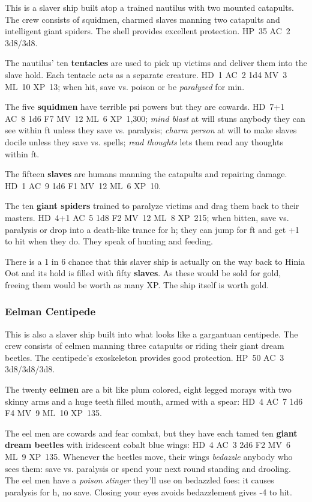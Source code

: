 \documentclass[11pt]{bxart}
\begin{document}
This is a slaver ship built atop a trained nautilus with two mounted
catapults. The crew consists of squidmen, charmed slaves manning two
catapults and intelligent giant spiders. The shell provides excellent
protection. HP~35 AC~2 3d8/3d8.

The nautilus' ten \textbf{tentacles} are used to pick up victims and
deliver them into the slave hold. Each tentacle acts as a separate
creature. HD~1 AC~2 1d4 MV~3 ML~10 XP~13; when hit, save vs. poison or
be \textit{paralyzed} for \unit[10]{min}.

The five \textbf{squidmen} have terrible psi powers but they are
cowards. HD~7+1 AC~8 1d6 F7 MV~12 ML~6 XP~1,300; \textit{mind blast} at
will stuns anybody they can see within \unit[60]{ft} unless they save
vs. paralysis; \textit{charm person} at will to make slaves docile
unless they save vs. spells; \textit{read thoughts} lets them read any
thoughts within \unit[60]{ft}.

The fifteen \textbf{slaves} are humans manning the catapults and
repairing damage. HD~1 AC~9 1d6 F1 MV~12 ML~6 XP~10.

The ten \textbf{giant spiders} trained to paralyze victims and drag
them back to their masters. HD~4+1 AC~5 1d8 F2 MV~12 ML~8 XP~215; when
bitten, save vs. paralysis or drop into a death-like trance for \unit[6]{h};
they can jump for \unit[20]{ft} and get +1 to hit when they do. They speak of
hunting and feeding.

There is a 1 in 6 chance that this slaver ship is actually on the way
back to Hinia Oot and its hold is filled with fifty \textbf{slaves}.
As these would be sold for \unit[25,000]{gold}, freeing them would be worth as
many XP. The ship itself is worth \unit[35,000]{gold}.

\subsubsection{Eelman Centipede}

This is also a slaver ship built into what looks like a gargantuan
centipede. The crew consists of eelmen manning three catapults or
riding their giant dream beetles. The centipede's exoskeleton provides
good protection. HP~50 AC~3 3d8/3d8/3d8.

The twenty \textbf{eelmen} are a bit like plum colored, eight legged
morays with two skinny arms and a huge teeth filled mouth, armed with
a spear: HD~4 AC~7 1d6 F4 MV~9 ML~10 XP~135.

The eel men are cowards and fear combat, but they have each tamed ten
\textbf{giant dream beetles} with iridescent cobalt blue wings: HD~4
AC~3 2d6 F2 MV~6 ML~9 XP~135. Whenever the beetles move, their wings
\textit{bedazzle} anybody who sees them: save vs. paralysis or spend
your next round standing and drooling. The eel men have a
\textit{poison stinger} they'll use on bedazzled foes: it causes
paralysis for \unit[1]{h}, no save. Closing your eyes avoids bedazzlement gives
-4 to hit.
\end{document}
